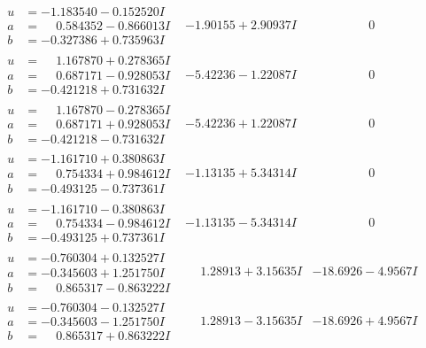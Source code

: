 \documentclass[1p]{elsarticle_modified}
\theoremstyle{definition}
\begin{document}
$$\begin{array}{c|c|c}
\begin{aligned}
u &= -1.183540 - 0.152520 I \\
a &= \phantom{-}0.584352 - 0.866013 I \\
b &= -0.327386 + 0.735963 I\end{aligned}
 & -1.90155 + 2.90937 I & \phantom{-0.000000 } 0 \\ \hline\begin{aligned}
u &= \phantom{-}1.167870 + 0.278365 I \\
a &= \phantom{-}0.687171 - 0.928053 I \\
b &= -0.421218 + 0.731632 I\end{aligned}
 & -5.42236 - 1.22087 I & \phantom{-0.000000 } 0 \\ \hline\begin{aligned}
u &= \phantom{-}1.167870 - 0.278365 I \\
a &= \phantom{-}0.687171 + 0.928053 I \\
b &= -0.421218 - 0.731632 I\end{aligned}
 & -5.42236 + 1.22087 I & \phantom{-0.000000 } 0 \\ \hline\begin{aligned}
u &= -1.161710 + 0.380863 I \\
a &= \phantom{-}0.754334 + 0.984612 I \\
b &= -0.493125 - 0.737361 I\end{aligned}
 & -1.13135 + 5.34314 I & \phantom{-0.000000 } 0 \\ \hline\begin{aligned}
u &= -1.161710 - 0.380863 I \\
a &= \phantom{-}0.754334 - 0.984612 I \\
b &= -0.493125 + 0.737361 I\end{aligned}
 & -1.13135 - 5.34314 I & \phantom{-0.000000 } 0 \\ \hline\begin{aligned}
u &= -0.760304 + 0.132527 I \\
a &= -0.345603 + 1.251750 I \\
b &= \phantom{-}0.865317 - 0.863222 I\end{aligned}
 & \phantom{-}1.28913 + 3.15635 I & -18.6926 - 4.9567 I \\ \hline\begin{aligned}
u &= -0.760304 - 0.132527 I \\
a &= -0.345603 - 1.251750 I \\
b &= \phantom{-}0.865317 + 0.863222 I\end{aligned}
 & \phantom{-}1.28913 - 3.15635 I & -18.6926 + 4.9567 I\\

\end{array}$$
\end{document}
